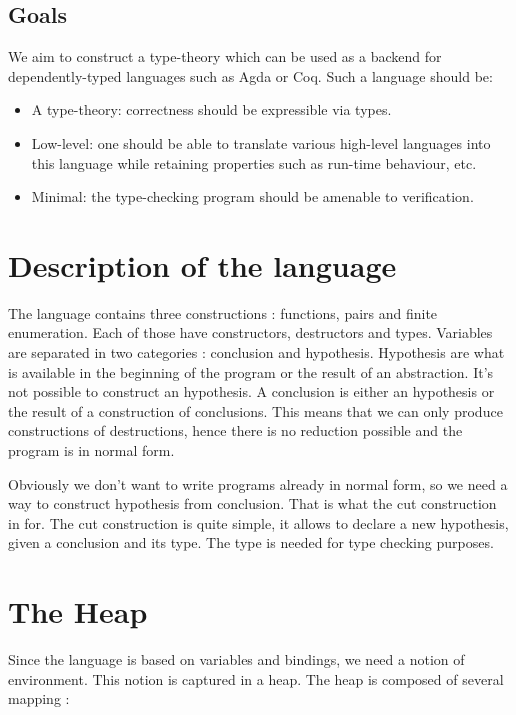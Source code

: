 \documentclass[11pt]{scrartcl}
\begin{document}

\subsection{Goals}
\label{sec:goals}

We aim to construct a type-theory which can be used as a backend for dependently-typed languages such as Agda or Coq. Such a language should be:
\begin{itemize}
\item A type-theory: correctness should be expressible via types.
\item Low-level: one should be able to translate various high-level
  languages into this language while retaining properties such as
  run-time behaviour, etc.
\item Minimal: the type-checking program should be amenable to
  verification.
\end{itemize}

\section{Description of the language}
\label{sec:description-language}

The language contains three constructions : functions, pairs and finite enumeration. Each of those have constructors, destructors and types.
Variables are separated in two categories : conclusion and hypothesis.
Hypothesis are what is available in the beginning of the program or the result of an abstraction. It's not possible to construct an hypothesis.
A conclusion is either an hypothesis or the result of a construction of conclusions.
This means that we can only produce constructions of destructions, hence there is no reduction possible and the program is in normal form.

 Obviously we don't want to write programs already in normal form, so we need a way to construct hypothesis from conclusion. That is what the cut construction in for. The cut construction is quite simple, it allows to declare a new hypothesis, given a conclusion and its type. The type is needed for type checking purposes.


\section{The Heap}
\label{sec:heap}

Since the language is based on variables and bindings, we need a notion of environment. This notion is captured in a heap. The heap is composed of several mapping :
\end{document}
